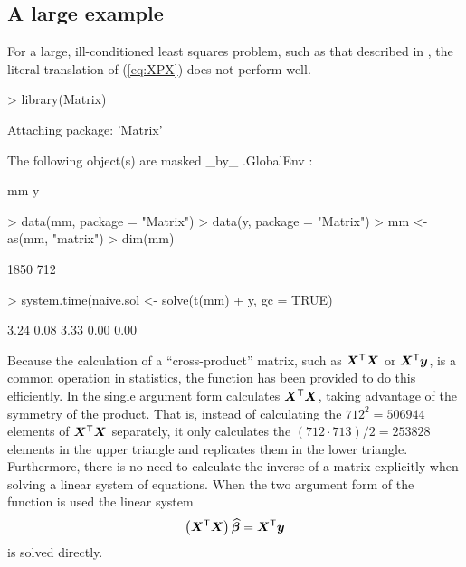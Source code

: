 \documentclass{article}
\begin{document}
\subsection{A large example}
\label{sec:largeLSQ}

For a large, ill-conditioned least squares problem, such as that
described in \citet{koen:ng:2003}, the literal translation of
(\ref{eq:XPX}) does not perform well.
\begin{Schunk}
\begin{Sinput}
> library(Matrix)
\end{Sinput}
\begin{Soutput}
Attaching package: 'Matrix'


	The following object(s) are masked _by_ .GlobalEnv :

	 mm y 
\end{Soutput}
\begin{Sinput}
> data(mm, package = "Matrix")
> data(y, package = "Matrix")
> mm <- as(mm, "matrix")
> dim(mm)
\end{Sinput}
\begin{Soutput}
[1] 1850  712
\end{Soutput}
\begin{Sinput}
> system.time(naive.sol <- solve(t(mm) %*% mm) %*% t(mm) %*% 
+     y, gc = TRUE)
\end{Sinput}
\begin{Soutput}
[1] 3.24 0.08 3.33 0.00 0.00
\end{Soutput}
\end{Schunk}

Because the calculation of a ``cross-product'' matrix, such as
$\bm{X}^\mathsf{T}\bm{X}$ or $\bm{X}^\mathsf{T}\bm{y}$, is a common operation in
statistics, the  function has been provided to do
this efficiently.  In the single argument form 
calculates $\bm{X}^\mathsf{T}\bm{X}$, taking advantage of the symmetry of the
product.  That is, instead of calculating the $712^2=506944$ elements of
$\bm{X}^\mathsf{T}\bm{X}$ separately, it only calculates the $(712\cdot
713)/2=253828$ elements in the upper triangle and replicates them in
the lower triangle. Furthermore, there is no need to calculate the
inverse of a matrix explicitly when solving a
linear system of equations.  When the two argument form of the 
function is used the linear system
\begin{equation}
  \label{eq:LSQsol}
  \left(\bm{X}^\mathsf{T}\bm{X}\right) \widehat{\bm{\beta}} = \bm{X}^\mathsf{T}\bm{y}
\end{equation}
is solved directly.
\end{document}
